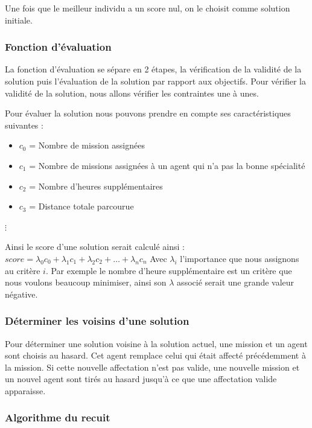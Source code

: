 \documentclass[11pt]{article}
\begin{document}
Une fois que le meilleur individu a un score nul, on le choisit comme solution initiale.

\subsubsection{Fonction d'évaluation}

La fonction d'évaluation se sépare en 2 étapes, la vérification de la validité de la solution puis l'évaluation de la solution par rapport aux objectifs. Pour vérifier la validité de la solution, nous allons vérifier les contraintes une à unes.\newline

Pour évaluer la solution nous pouvons prendre en compte ses caractéristiques suivantes :
\begin{itemize}
    \item $c_0$ = Nombre de mission assignées
    \item $c_1$ = Nombre de missions assignées à un agent qui n'a pas la bonne spécialité
    \item $c_2$ = Nombre d'heures supplémentaires
    \item $c_3$ = Distance totale parcourue
\end{itemize}
\tabto{1.3cm}$\vdots$

Ainsi le score d'une solution serait calculé ainsi :\newline
\tabto{2cm} $score = \lambda_0 c_0 + \lambda_1 c_1 + \lambda_2 c_2 + \dots +\lambda_n c_n$ \newline
Avec $\lambda_i$ l'importance que nous assignons au critère $i$. Par exemple le nombre d'heure supplémentaire est un critère que nous voulons beaucoup minimiser, ainsi son $\lambda$ associé serait une grande valeur négative.



\subsubsection{Déterminer les voisins d'une solution}

Pour déterminer une solution voisine à la solution actuel, une mission et un agent sont choisis au hasard. Cet agent remplace celui qui était affecté précédemment à la mission. Si cette nouvelle affectation n'est pas valide, une nouvelle mission et un nouvel agent sont tirés au hasard jusqu'à ce que une affectation valide apparaisse.


\newpage
\subsubsection{Algorithme du recuit}
\end{document}

